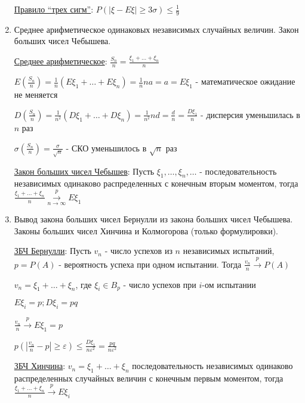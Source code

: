 \documentclass[12pt]{article}
\begin{document}
\begin{enumerate}
    \hyperlink{ruleofthreesigmas}{Правило \enquote{трех сигм}}: \Ths $P(|\xi - E\xi| \geq 3\sigma) \leq \frac{1}{9}$

    \item Среднее арифметическое одинаковых независимых случайных величин. Закон больших чисел Чебышева.

    \hyperlink{averagevalueofrandomvariables}{Среднее арифметическое}: $\frac{S_n}{n} = \frac{\xi_1 + \dots + \xi_n}{n}$

    $E\left(\frac{S_n}{n}\right) = \frac{1}{n} (E\xi_1 + \dots + E\xi_n) = \frac{1}{n} na = a = E\xi_1$ - математическое ожидание не меняется

    $D\left(\frac{S_n}{n}\right) = \frac{1}{n^2} (D\xi_1 + \dots + D\xi_n) = \frac{1}{n^2} nd = \frac{d}{n} = \frac{D\xi_1}{n}$ - дисперсия уменьшилась в $n$ раз

    $\sigma\left(\frac{S_n}{n}\right) = \frac{\sigma}{\sqrt{n}}$ - СКО уменьшилось в $\sqrt{n}$ раз

    \hyperlink{lawofbignumberschebyshev}{Закон больших чисел Чебышев}: \Ths Пусть $\xi_1, \dots, \xi_n, \dots$ - последовательность независимых одинаково распределенных с конечным вторым моментом,
    тогда $\frac{\xi_1 + \dots + \xi_n}{n} \overset{p}{\underset{n \to \infty}{\longrightarrow}} E\xi_1$

    \item Вывод закона больших чисел Бернулли из закона больших чисел Чебышева. Законы больших чисел Хинчина и Колмогорова (только формулировки).

    \hyperlink{lawofbignumbersbernoulli2}{ЗБЧ Бернулли}: \Ths Пусть $v_n$ - число успехов из $n$ независимых испытаний, $p = P(A)$ - вероятность успеха при одном испытании.
    Тогда $\frac{v_n}{n} \overset{p}{\longrightarrow} P(A)$

    \begin{MyProof}
        $v_n = \xi_1 + \dots + \xi_n$, где $\xi_i \in B_p$ - число успехов при $i$-ом испытании

        $E\xi_i = p; D\xi_i = pq$

        $\frac{v_n}{n} \overset{p}{\longrightarrow} E\xi_1 = p$

        $p\left(\left|\frac{v_n}{n} - p\right| \geq \varepsilon\right) \leq \frac{D\xi_1}{n\varepsilon^2} = \frac{pq}{n\varepsilon^2}$
    \end{MyProof}

    \hyperlink{lawofbignumberskhinchin}{ЗБЧ Хинчина}: \Ths $v_n = \xi_1 + \dots + \xi_n$ последовательность независимых одинаково распределенных случайных величин с конечным первым моментом, тогда
    $\frac{\xi_1 + \dots + \xi_n}{n} \overset{p}{\longrightarrow} E\xi_i$


\end{enumerate}
\end{document}
